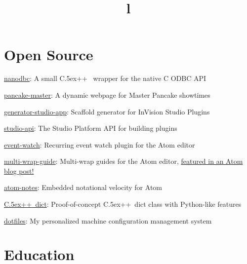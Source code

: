 \documentclass[12pt, tweaklist, line]{res}
\let\tempone\itemize
\let\temptwo\enditemize
\renewenvironment{itemize}{\tempone\vspace{-.15in}\setlength{\topsep}{0pt}\setlength{\itemsep}{3pt}\vspace{-.15in}}{\temptwo}
\def\Cplusplus{{\rm C\raise.5ex\hbox{\small ++}}}
\begin{document}
\begin{resume}
\vspace{-.08in}
\section{Open Source}
\begin{itemize}
\vspace{.55in} %
\item \href{http://nanodbc.io}{nanodbc}: A small \Cplusplus~ wrapper for the native C ODBC API
\item \href{http://pancake.lexicalunit.com}{pancake-master}: A dynamic webpage for Master Pancake showtimes
\item \href{https://www.npmjs.com/package/generator-studio-app}{generator-studio-app}: Scaffold generator for InVision Studio Plugins
\item \href{https://www.npmjs.com/package/@invisionapp/studio-api}{studio-api}: The Studio Platform API for building plugins
\item \href{https://atom.io/packages/event-watch}{event-watch}: Recurring event watch plugin for the Atom editor
\item \href{https://atom.io/packages/multi-wrap-guide}{multi-wrap-guide}: Multi-wrap guides for the Atom editor, \href{http://blog.atom.io/2015/08/06/new-package-roundup.html}{featured in an Atom blog post!}
\item \href{https://github.com/lexicalunit/atom-notes}{atom-notes}: Embedded notational velocity for Atom
\item \href{https://github.com/lexicalunit/dict}{\Cplusplus~dict}: Proof-of-concept \Cplusplus~dict class with Python-like features
\item \href{https://github.com/lexicalunit/dotfiles}{dotfiles}: My personalized machine configuration management system
\end{itemize}

\section{Education}
\begin{format}
  \\
  \title{l}\\
  \body\\
\end{format}


\end{resume}
\end{document}

